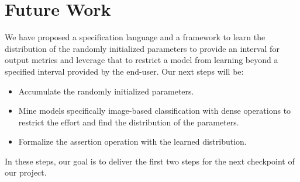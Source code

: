 \section{Future Work}
\label{sec:future}
We have proposed a specification language and a framework to learn the distribution of the randomly initialized parameters to provide an interval for output metrics and leverage that to restrict a model from learning beyond a specified interval provided by the end-user. Our next steps will be:
\begin{itemize}
	\item Accumulate the randomly initialized parameters.
	\item Mine models specifically image-based classification with dense operations to restrict the effort and find the distribution of the parameters.
	\item Formalize the assertion operation with the learned distribution.
\end{itemize}
In these steps, our goal is to deliver the first two steps for the next checkpoint of our project.